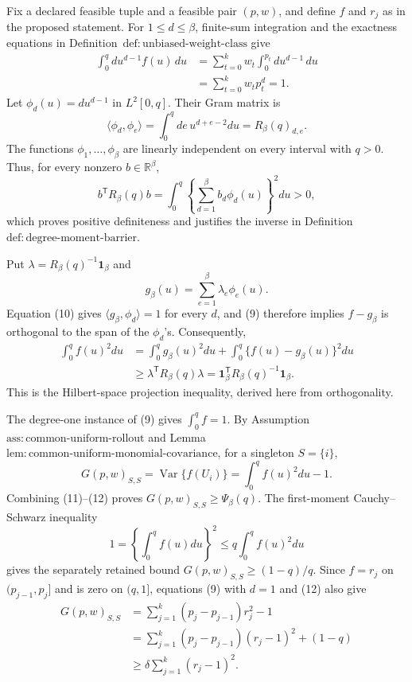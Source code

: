 Fix a declared feasible tuple and a feasible pair \((p,w)\), and define \(f\) and \(r_j\) as in the proposed statement.  For \(1\le d\le\beta\), finite-sum integration and the exactness equations in Definition~\(\mathrm{def{:}unbiased\text{-}weight\text{-}class}\) give
\[
\begin{aligned}
\int_0^q d u^{d-1}f(u)\,du
&=\sum_{t=0}^kw_t\int_0^{p_t}d u^{d-1}\,du\\
&=\sum_{t=0}^kw_tp_t^d=1.
\end{aligned}
\tag{9}
\]
Let \(\phi_d(u)=d u^{d-1}\) in \(L^2[0,q]\).  Their Gram matrix is
\[
\langle\phi_d,\phi_e\rangle
=\int_0^qde\,u^{d+e-2}du
=R_\beta(q)_{d,e}.
\tag{10}
\]
The functions \(\phi_1,\ldots,\phi_\beta\) are linearly independent on every interval with \(q>0\).  Thus, for every nonzero \(b\in\mathbb R^\beta\),
\[
b^{\mathsf T}R_\beta(q)b
=\int_0^q\left\{\sum_{d=1}^\beta b_d\phi_d(u)\right\}^2du>0,
\]
which proves positive definiteness and justifies the inverse in Definition~\(\mathrm{def{:}degree\text{-}moment\text{-}barrier}\).

Put \(\lambda=R_\beta(q)^{-1}\mathbf1_\beta\) and
\[
g_\beta(u)=\sum_{e=1}^\beta\lambda_e\phi_e(u).
\]
Equation (10) gives \(\langle g_\beta,\phi_d\rangle=1\) for every \(d\), and (9) therefore implies \(f-g_\beta\) is orthogonal to the span of the \(\phi_d\)'s.  Consequently,
\[
\begin{aligned}
\int_0^q f(u)^2du
&=\int_0^q g_\beta(u)^2du
+\int_0^q\{f(u)-g_\beta(u)\}^2du\\
&\ge \lambda^{\mathsf T}R_\beta(q)\lambda
=\mathbf1_\beta^{\mathsf T}R_\beta(q)^{-1}\mathbf1_\beta.
\end{aligned}
\tag{11}
\]
This is the Hilbert-space projection inequality, derived here from orthogonality.

The degree-one instance of (9) gives \(\int_0^qf=1\).  By Assumption~\(\mathrm{ass{:}common\text{-}uniform\text{-}rollout}\) and Lemma~\(\mathrm{lem{:}common\text{-}uniform\text{-}monomial\text{-}covariance}\), for a singleton \(S=\{i\}\),
\[
G(p,w)_{S,S}
=\operatorname{Var}\{f(U_i)\}
=\int_0^qf(u)^2du-1.
\tag{12}
\]
Combining (11)--(12) proves \(G(p,w)_{S,S}\ge\Psi_\beta(q)\).  The first-moment Cauchy--Schwarz inequality
\[
1=\left\{\int_0^qf(u)du\right\}^2
\le q\int_0^qf(u)^2du
\tag{13}
\]
gives the separately retained bound \(G(p,w)_{S,S}\ge(1-q)/q\).  Since \(f=r_j\) on \((p_{j-1},p_j]\) and is zero on \((q,1]\), equations (9) with \(d=1\) and (12) also give
\[
\begin{aligned}
G(p,w)_{S,S}
&=\sum_{j=1}^k(p_j-p_{j-1})r_j^2-1\\
&=\sum_{j=1}^k(p_j-p_{j-1})(r_j-1)^2+(1-q)\\
&\ge\delta\sum_{j=1}^k(r_j-1)^2.
\end{aligned}
\tag{14}
\]

